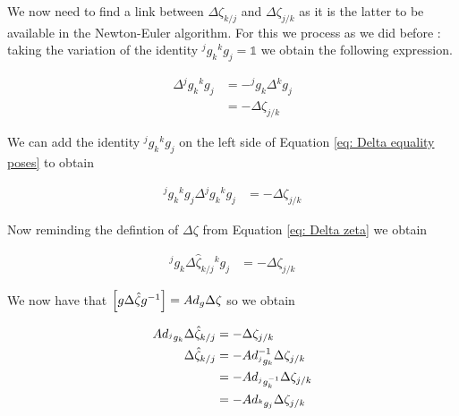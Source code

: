 \documentclass[12pt,a4paper]{book}
\begin{document}
We now need to find a link between $\Delta \zeta_{k/j}$ and $\Delta \zeta_{j/k}$ as it is the latter to be available in the Newton-Euler algorithm.
For this we process as we did before : taking the variation of the identity ${^j g _k } {^k g _j } = \mathbb{1}$ we obtain the following expression.

\begin{equation}\label{eq: Delta equality poses}
\begin{aligned}
	\Delta {^j g _k } {^k g _j }	&= - {^j g _k } \Delta{^k g _j } \\
									&= - \Delta \zeta _{j/k}
\end{aligned}
\end{equation}

We can add the identity ${^j g _k } {^k g _j }$ on the left side of Equation \eqref{eq: Delta equality poses} to obtain 

\begin{equation}\label{eq: Delta equality poses 2 }
\begin{aligned}
	{^j g _k } {^k g _j } \Delta {^j g _k } {^k g _j }	&= - \Delta \zeta _{j/k}
\end{aligned}
\end{equation}

Now reminding the defintion of $\Delta \zeta $ from Equation \eqref{eq: Delta zeta} we obtain 

\begin{equation}\label{eq: Delta equality poses 3 }
\begin{aligned}
	{^j g _k } \Delta \hat{\zeta} _ {k/j} {^k g _j }	&= - \Delta \zeta _{j/k}
\end{aligned}
\end{equation}

We now have that $\left[ g \Delta \hat{\zeta} g ^{-1} \right] = Ad_g \Delta \zeta$ so we obtain

\begin{equation}\label{eq: Delta equality poses 4 }
\begin{aligned}
	Ad_{^j g _k } \Delta \hat{\zeta} _ {k/j}	&= - \Delta \zeta _{j/k} \\
	\Delta \hat{\zeta} _ {k/j}	&= - Ad_{^j g _k }  ^{-1} \Delta \zeta _{j/k} \\
								&= - Ad_{^j g _k ^{-1}}   \Delta \zeta _{j/k} \\
								&= - Ad_{^k g _j}   \Delta \zeta _{j/k} \\
\end{aligned}
\end{equation}
\end{document}
